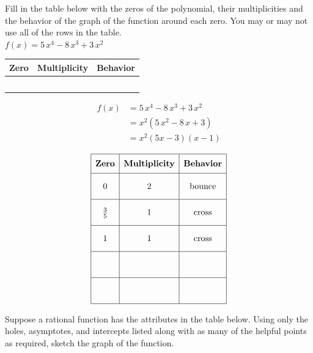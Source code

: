 \documentclass[addpoints]{exam}
\begin{document}
\begin{questions}
\question[10] Fill in the table below with the zeros of the polynomial, their multiplicities and the behavior of the graph of the function around each zero. You may or may not use all of the rows in the table.\\
    
    \(\displaystyle{ f(x) = 5 \, x^{4} - 8 \, x^{3} + 3 \, x^{2} }\)\
    
\renewcommand{\arraystretch}{3}
\begin{tabular}{|p{20mm}|p{25mm}|p{20mm}|}\hline
\textbf{Zero} & \textbf{Multiplicity} & \textbf{Behavior}\\ \hline
 & & \\ \hline
 & & \\ \hline
 & & \\ \hline
 & & \\ \hline
 & & \\ \hline
\end{tabular}
\begin{solution}
\[\begin{aligned} f(x) &= 5 \, x^{4} - 8 \, x^{3} + 3 \, x^{2} \\ &= x^2(5 \, x^{2} - 8 \, x + 3) \\ &= x^2(5x - 3)(x - 1) \end{aligned}\]

 \[\begin{array}{|c|c|c|} \hline \rule[-0.8em]{0pt}{2.2em} \textbf{Zero} & \textbf{Multiplicity} & \textbf{Behavior} \\ \hline \rule[-1.2em]{0pt}{3em} 0 & 2 & \text{bounce} \\ \hline \rule[-1.2em]{0pt}{3em} \frac{3}{5} & 1 & \text{cross} \\ \hline \rule[-1.2em]{0pt}{3em} 1 & 1 & \text{cross} \\ \hline \rule[-1.2em]{0pt}{3em} & & \\ \hline \rule[-1.2em]{0pt}{3em} & & \\ \hline \end{array}\]
\end{solution}
\newpage

\question[5] Suppose a rational function has the attributes in the table below. Using only the holes, asymptotes, and intercepts listed along with as many of the helpful points as required, sketch the graph of the function.\\
\renewcommand{\arraystretch}{1.5}
    

\end{questions}
\end{document}
